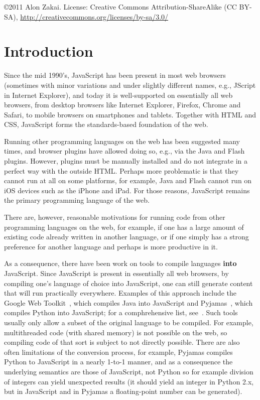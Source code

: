 \documentclass[11pt]{proc}
\begin{document}
\bigskip

\copyright 2011 Alon Zakai. License: Creative Commons Attribution-ShareAlike (CC BY-SA), \url{http://creativecommons.org/licenses/by-sa/3.0/}

\section{Introduction}

Since the mid 1990's, JavaScript has been present in most web browsers (sometimes
with minor variations and under slightly different names, e.g., JScript in Internet
Explorer), and today it is
well-supported on essentially all web browsers, from desktop browsers like
Internet Explorer, Firefox, Chrome and Safari, to mobile browsers on smartphones
and tablets. Together with HTML and CSS, JavaScript forms the standards-based
foundation of the web.

Running other programming languages on the web has been suggested many times,
and browser plugins have allowed doing so, e.g., via the Java
and Flash plugins. However, plugins must be manually installed and do not integrate in
a perfect way with the outside HTML. Perhaps more problematic is that they cannot run
at all on some platforms, for example, Java and Flash cannot run on iOS devices such as the iPhone
and iPad. For those reasons, JavaScript remains
the primary programming language of the web.

There are, however, reasonable motivations for running code from
other programming languages on the web, for example, if one has a large
amount of existing code already written in another language, or if one
simply has a strong preference for another language and perhaps is
more productive in it.

As a consequence, there have been work on tools to compile languages
\textbf{into} JavaScript. Since JavaScript is present in essentially all web
browsers, by compiling one's language of choice into JavaScript, one
can still generate content that will run practically everywhere.
Examples of this approach include the Google Web Toolkit~\cite{gwt}, which compiles
Java into JavaScript and Pyjamas~\cite{pyjamas}, which compiles Python into JavaScript; for a comphrehensive
list, see~\cite{ashkenas}.
Such tools usually only allow a subset of the original language to
be compiled. For example, multithreaded code (with shared memory) is
not possible on the web, so compiling code of that sort is subject to
not directly possible. There are also often limitations of the conversion
process, for example, Pyjamas compiles Python to JavaScript in a nearly
1-to-1 manner, and as a consequence the underlying semantics are those of JavaScript,
not Python so for example division of integers can yield unexpected results
(it should yield an integer in Python 2.x,
but in JavaScript and in Pyjamas a floating-point number can be generated).
\end{document}
